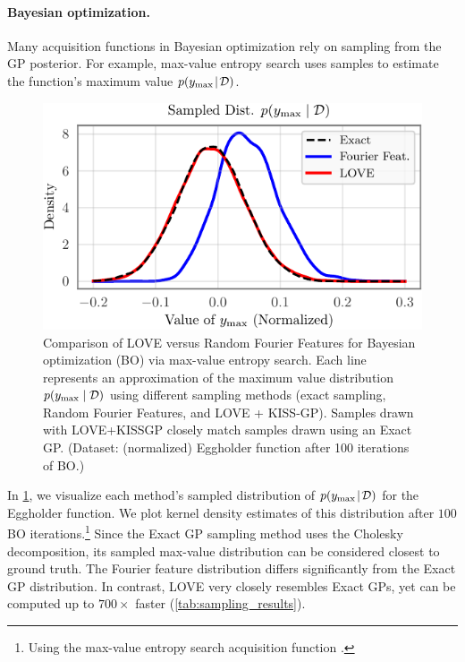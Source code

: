\paragraph{Bayesian optimization.}
Many acquisition functions in Bayesian optimization rely on sampling from the GP posterior.
For example, max-value entropy search \cite{wang2017max} uses samples to estimate the function's maximum value $p(y_\text{max} \! \mid \! \mathcal D)$.
%
\begin{figure}[t!]
  \centering
  \includegraphics[width=0.65\columnwidth]{figures/love_sampling_comparison.pdf}
  \caption[Comparison of LOVE versus Random Fourier Features for Bayesian optimization via max-value entropy search.]{
    Comparison of LOVE versus Random Fourier Features for Bayesian optimization (BO) via max-value entropy search.
    Each line represents an approximation of the maximum value distribution $p(y_\text{max} \mid \mathcal D)$ using different sampling methods (exact sampling, Random Fourier Features, and LOVE + KISS-GP).
    Samples drawn with LOVE+KISSGP closely match samples drawn using an Exact GP.
    (Dataset: (normalized) Eggholder function after 100 iterations of BO.)
    \label{fig:love_sampling_comparison}
  }
\end{figure}
%
In \cref{fig:love_sampling_comparison}, we visualize each method's sampled distribution of $p(y_\text{max} \! \mid \! \mathcal D)$ for the Eggholder function.
We plot kernel density estimates of this distribution after $100$ BO iterations.\footnote{
  Using the max-value entropy search acquisition function \citep{wang2017max}.
}
Since the Exact GP sampling method uses the Cholesky decomposition, its sampled max-value distribution can be considered closest to ground truth.
The Fourier feature distribution differs significantly from the Exact GP distribution.
In contrast, LOVE{} very closely resembles Exact GPs, yet can be computed up to $700 \times$ faster (\cref{tab:sampling_results}).
